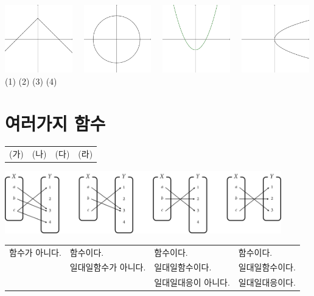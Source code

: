 \documentclass{oblivoir}
\begin{document}
%
\label{graph5}
\begin{center}
\includegraphics[width=0.22\textwidth]{graph_5-1}~~
\includegraphics[width=0.22\textwidth]{graph_5-2}~~
\includegraphics[width=0.22\textwidth]{graph_5-3}~~
\includegraphics[width=0.22\textwidth]{graph_5-4}\\
(1)
\qquad\qquad\qquad\quad
(2)
\qquad\qquad\qquad\quad
(3)
\qquad\qquad\qquad\quad
(4)
\end{center}

\newpage
\section{여러가지 함수}

\begin{center}
\begin{tabu}{X[c]X[c]X[c]X[c]}
(가)				&(나)				&(다)				&(라)\\
\end{tabu}
\includegraphics[width=0.9\textwidth]{various_0}\par
\begin{tabu}{>{\scriptsize}X[c]>{\scriptsize}X[c]>{\scriptsize}X[c]>{\scriptsize}X[c]}
함수가 아니다. 	&함수이다. 			&함수이다.			&함수이다.\\
				&일대일함수가 아니다.	&일대일함수이다.		&일대일함수이다.\\
				&					&일대일대응이 아니다.	&일대일대응이다.
\end{tabu}
\end{center}
\end{document}
